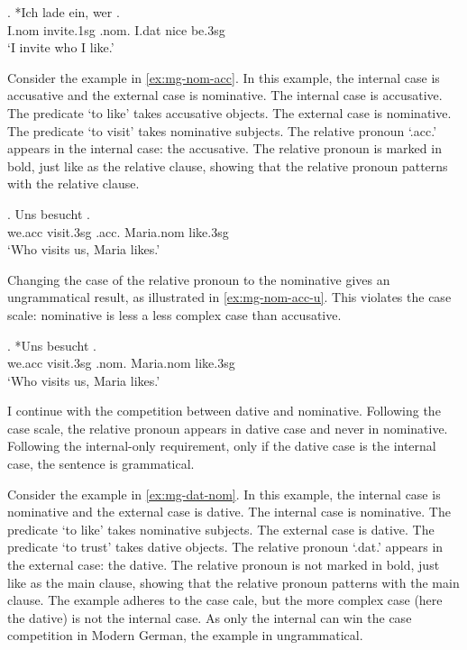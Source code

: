 \exg. *Ich {lade ein}, wer   .\\
I.\ac{nom} invite.1\ac{sg}\scsub{[acc]} .\ac{nom}. I.\ac{dat} nice be.3\ac{sg}\scsub{[nom]}\\
`I invite who I like.' \label{ex:mg-acc-nom-u}

Consider the example in \ref{ex:mg-nom-acc}. In this example, the internal case is accusative and the external case is nominative.
The internal case is accusative. The predicate  `to like' takes accusative objects.
The external case is nominative. The predicate  `to visit' takes nominative subjects.
The relative pronoun  `.\ac{acc}.' appears in the internal case: the accusative. The relative pronoun is marked in bold, just like as the relative clause, showing that the relative pronoun patterns with the relative clause.

\exg. Uns besucht   .\\
 we.\ac{acc} visit.3\ac{sg}\scsub{[nom]} .\ac{acc}. Maria.\ac{nom} like.3\ac{sg}\scsub{[acc]}\\
 `Who visits us, Maria likes.' \label{ex:mg-nom-acc}

Changing the case of the relative pronoun to the nominative gives an ungrammatical result, as illustrated in \ref{ex:mg-nom-acc-u}. This violates the case scale: nominative is less a less complex case than accusative.

\exg. *Uns besucht   .\\
 we.\ac{acc} visit.3\ac{sg}\scsub{[nom]} .\ac{nom}. Maria.\ac{nom} like.3\ac{sg}\scsub{[acc]}\\
 `Who visits us, Maria likes.' \label{ex:mg-nom-acc-u}

I continue with the competition between dative and nominative. Following the case scale, the relative pronoun appears in dative case and never in nominative. Following the internal-only requirement, only if the dative case is the internal case, the sentence is grammatical.

Consider the example in \ref{ex:mg-dat-nom}. In this example, the internal case is nominative and the external case is dative.
The internal case is nominative. The predicate  `to like' takes nominative subjects.
The external case is dative. The predicate  `to trust' takes dative objects.
The relative pronoun  `.\ac{dat}.' appears in the external case: the dative. The relative pronoun is not marked in bold, just like as the main clause, showing that the relative pronoun patterns with the main clause.
The example adheres to the case cale, but the more complex case (here the dative) is not the internal case. As only the internal can win the case competition in Modern German, the example in ungrammatical.

